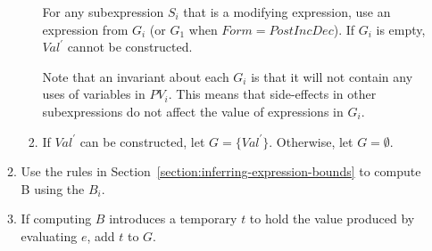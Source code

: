 \begin{enumerate}
\begin{enumerate}
\begin{enumerate}
      For any subexpression $S_i$ that is a modifying expression, 
      use an expression from $G_i$ (or $G_1$ when $Form = PostIncDec$). If $G_i$ is empty, $Val^\prime$ cannot
      be constructed.
      
      Note that an invariant about each $G_i$ is that it will not contain any uses of variables in $PV_i$.
      This means that side-effects in other subexpressions do not affect the value of expressions in $G_i$.
\item If $Val^\prime$ can be constructed, let $G = \{ Val^\prime \}$.  Otherwise, let $G = \emptyset$.	
\end{enumerate}
\item Use the rules in Section~\ref{section:inferring-expression-bounds} to compute B using the $B_i$. 
\item If computing $B$ introduces a temporary $t$ to hold the value produced by evaluating $e$, add $t$ to $G$.
\end{enumerate}
\end{enumerate}

